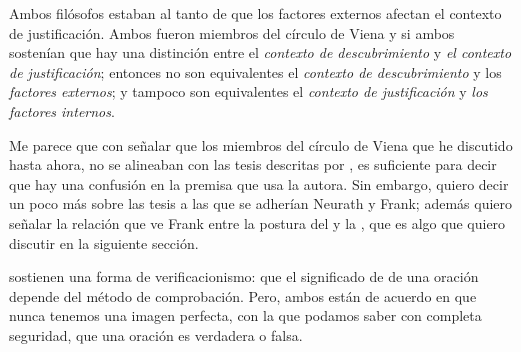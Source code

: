 Ambos filósofos estaban al tanto de que los factores externos afectan el contexto de justificación.
Ambos fueron miembros del círculo de Viena y si ambos sostenían que hay una distinción entre el \emph{contexto de descubrimiento} y \emph{el contexto de justificación}; entonces no son equivalentes el \emph{contexto de descubrimiento} y los \emph{factores externos}; y  tampoco son equivalentes el \emph{contexto de justificación} y \emph{los factores internos}.

Me parece que con señalar que los miembros del círculo de Viena que he discutido hasta ahora, no se alineaban con las tesis descritas por \parencite{Yturbe1995}, es suficiente para decir que hay una confusión en la premisa que usa la autora.
Sin embargo, quiero decir un poco más sobre las tesis a las que se adherían Neurath y Frank; además quiero señalar la relación que ve Frank entre la postura del  y la , que es algo que quiero discutir en la siguiente sección.

 sostienen una forma de verificacionismo: que el significado de de una oración depende del método de comprobación.
Pero, ambos están de acuerdo en que nunca tenemos una imagen perfecta, con la que podamos saber con completa seguridad, que una oración es verdadera o falsa.







